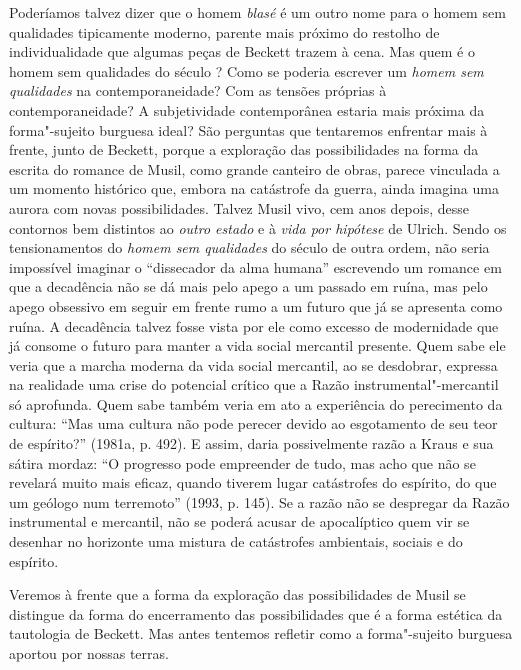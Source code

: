 Poderíamos talvez dizer que o homem \emph{blasé} é um outro nome para o
homem sem qualidades tipicamente moderno, parente mais próximo do
restolho de individualidade que algumas peças de Beckett trazem à cena.
Mas quem é o homem sem qualidades do século ? Como se poderia
escrever um \emph{homem sem qualidades} na contemporaneidade? Com as
tensões próprias à contemporaneidade? A subjetividade contemporânea
estaria mais próxima da forma"-sujeito burguesa ideal? São perguntas que
tentaremos enfrentar mais à frente, junto de Beckett, porque a
exploração das possibilidades na forma da escrita do romance de Musil,
como grande canteiro de obras, parece vinculada a um momento histórico
que, embora na catástrofe da guerra, ainda imagina uma aurora com novas
possibilidades. Talvez Musil vivo, cem anos depois, desse contornos bem
distintos ao \emph{outro estado} e à \emph{vida por hipótese} de Ulrich.
Sendo os tensionamentos do \emph{homem sem qualidades} do século  de
outra ordem, não seria impossível imaginar o ``dissecador da alma
humana'' escrevendo um romance em que a decadência não se dá mais pelo
apego a um passado em ruína, mas pelo apego obsessivo em seguir em
frente rumo a um futuro que já se apresenta como ruína. A decadência
talvez fosse vista por ele como excesso de modernidade que já consome o
futuro para manter a vida social mercantil presente. Quem sabe ele veria que a
marcha moderna da vida social mercantil, ao se desdobrar, expressa na
realidade uma crise do potencial crítico que a Razão
instrumental"-mercantil só aprofunda. Quem sabe também veria em ato a
experiência do perecimento da cultura: ``Mas uma cultura não pode
perecer devido ao esgotamento de seu teor de espírito?'' (1981a, p.
492). E assim, daria possivelmente razão a Kraus e sua sátira mordaz:
``O progresso pode empreender de tudo, mas acho que não se revelará
muito mais eficaz, quando tiverem lugar catástrofes do espírito, do que
um geólogo num terremoto'' (1993, p. 145). Se a razão não se despregar
da Razão instrumental e mercantil, não se poderá acusar de apocalíptico
quem vir se desenhar no horizonte uma mistura de catástrofes ambientais,
sociais e do espírito.

Veremos à frente que a forma da exploração das possibilidades de Musil se
distingue da forma do encerramento das possibilidades que é a forma
estética da tautologia de Beckett. Mas antes tentemos refletir como a
forma"-sujeito burguesa aportou por nossas terras.


